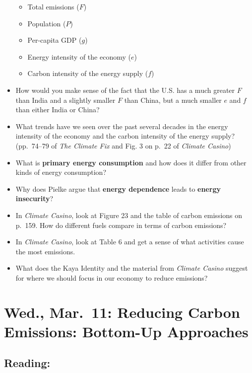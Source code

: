 \documentclass[
]{article}
\providecommand{\tightlist}{%
  \setlength{\itemsep}{0pt}\setlength{\parskip}{0pt}}
\newcommand{\COO}{\ce{CO2}}
\begin{document}
\begin{itemize}
  \begin{itemize}
  \tightlist
  \item
    Total \COO emissions (\(F\))
  \item
    Population (\(P\))
  \item
    Per-capita GDP (\(g\))
  \item
    Energy intensity of the economy (\(e\))
  \item
    Carbon intensity of the energy supply (\(f\))
  \end{itemize}
\item
  How would you make sense of the fact that the U.S. has a much greater
  \(F\) than India and a slightly smaller \(F\) than China, but a much
  smaller \(e\) and \(f\) than either India or China?
\item
  What trends have we seen over the past several decades in the energy
  intensity of the economy and the carbon intensity of the energy
  supply? (pp.~74--79 of \emph{The Climate Fix} and Fig. 3 on p.~22 of
  \emph{Climate Casino})
\item
  What is \textbf{primary energy consumption} and how does it differ
  from other kinds of energy consumption?
\item
  Why does Pielke argue that \textbf{energy dependence} leads to
  \textbf{energy insecurity}?
\item
  In \emph{Climate Casino}, look at Figure 23 and the table of carbon
  emissions on p.~159. How do different fuels compare in terms of carbon
  emissions?
\item
  In \emph{Climate Casino}, look at Table 6 and get a sense of what
  activities cause the most \COO emissions.
\item
  What does the Kaya Identity and the material from \emph{Climate
  Casino} suggest for where we should focus in our economy to reduce
  \COO emissions?
\end{itemize}

\hypertarget{wed.-mar.-11-reducing-carbon-emissions-bottom-up-approaches}{%
\section{Wed., Mar.~11: Reducing Carbon Emissions: Bottom-Up
Approaches}\label{wed.-mar.-11-reducing-carbon-emissions-bottom-up-approaches}}

\hypertarget{reading-24}{%
\subsection{Reading:}\label{reading-24}}
\end{document}
